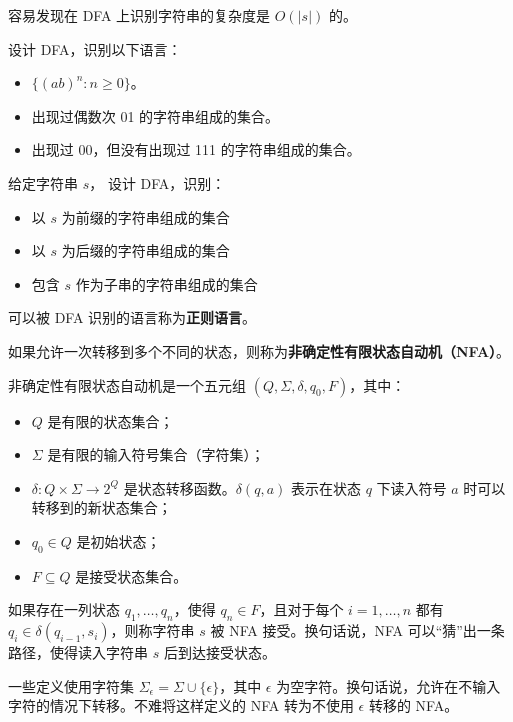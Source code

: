容易发现在 DFA 上识别字符串的复杂度是 $O(|s|)$ 的。
\begin{exercise}
    设计 DFA，识别以下语言：
    \begin{itemize}
        \item $\{(ab)^n : n\ge 0\}$。
        \item 出现过偶数次 01 的字符串组成的集合。
        \item 出现过 00，但没有出现过 111 的字符串组成的集合。
    \end{itemize}
\end{exercise}
\begin{exercise}
    给定字符串 $s$， 设计 DFA，识别：
    \begin{itemize}
        \item 以 $s$ 为前缀的字符串组成的集合
        \item 以 $s$ 为后缀的字符串组成的集合
        \item 包含 $s$ 作为子串的字符串组成的集合
    \end{itemize}
\end{exercise}

可以被 DFA 识别的语言称为\textbf{正则语言}。

如果允许一次转移到多个不同的状态，则称为\textbf{非确定性有限状态自动机（NFA）}。
\begin{definition}
    非确定性有限状态自动机是一个五元组 $(Q,\Sigma,\delta,q_0,F)$，其中：
    \begin{itemize}
        \item $Q$ 是有限的状态集合；
        \item $\Sigma$ 是有限的输入符号集合（字符集）；
        \item $\delta: Q\times \Sigma\to 2^Q$ 是状态转移函数。$\delta(q,a)$ 表示在状态 $q$ 下读入符号 $a$ 时可以转移到的新状态集合；
        \item $q_0\in Q$ 是初始状态；
        \item $F\subseteq Q$ 是接受状态集合。
    \end{itemize}
    如果存在一列状态 $q_1,\ldots,q_n$，使得 $q_n\in F$，且对于每个 $i=1,\ldots,n$ 都有 $q_{i}\in \delta(q_{i-1},s_{i})$，则称字符串 $s$ 被 NFA 接受。换句话说，NFA 可以“猜”出一条路径，使得读入字符串 $s$ 后到达接受状态。
\end{definition}
\begin{remark}
    一些定义使用字符集 $\Sigma_\epsilon=\Sigma\cup\{\epsilon\}$，其中 $\epsilon$ 为空字符。换句话说，允许在不输入字符的情况下转移。不难将这样定义的 NFA 转为不使用 $\epsilon$ 转移的 NFA。 
\end{remark}

